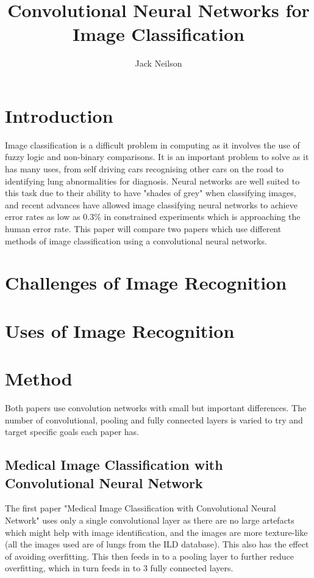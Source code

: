 \documentclass{article}
\begin{document}
\title{Convolutional Neural Networks for Image Classification}
\author{Jack Neilson}

\maketitle
\newpage
\section{Introduction}
Image classification is a difficult problem in computing as it involves the use of fuzzy logic and non-binary comparisons. It is an important problem to solve as it has many uses, from self driving cars recognising other cars on the road to identifying lung abnormalities for diagnosis\cite{medical}. Neural networks are well suited to this task due to their ability to have "shades of grey" when classifying images, and recent advances have allowed image classifying neural networks to achieve error rates as low as 0.3\% in constrained experiments which is approaching the human error rate\cite{imagenet}. This paper will compare two papers which use different methods of image classification using a convolutional neural networks.

\section{Challenges of Image Recognition}



\section{Uses of Image Recognition}


\section{Method}
Both papers use convolution networks with small but important differences. The number of convolutional, pooling and fully connected layers is varied to try and target specific goals each paper has.

\subsection{Medical Image Classification with Convolutional Neural Network}
The first paper "Medical Image Classification with Convolutional Neural Network" uses only a single convolutional layer as there are no large artefacts which might help with image identification, and the images are more texture-like (all the images used are of lungs from the ILD database)\cite{medical}. This also has the effect of avoiding overfitting\cite{medical}. This then feeds in to a pooling layer to further reduce overfitting, which in turn feeds in to 3 fully connected layers.
\end{document}
